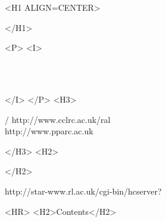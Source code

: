 \begin{htmlonly}
   \xlabel{}
   \begin{rawhtml} <H1 ALIGN=CENTER> \end{rawhtml}
      \stardoctitle
   \begin{rawhtml} </H1> \end{rawhtml}

   \begin{center}
   \end{center}

   \begin{rawhtml} <P> <I> \end{rawhtml}
   \stardoccategory\ \stardocnumber \\
   \stardocauthors \\
   \stardocdate
   \begin{rawhtml} </I> </P> <H3> \end{rawhtml}
       /
                        {http://www.cclrc.ac.uk/ral} \\
                        {http://www.pparc.ac.uk} \\
   \begin{rawhtml} </H3> <H2> \end{rawhtml}
   \begin{rawhtml} </H2> \end{rawhtml}
      {http://star-www.rl.ac.uk/cgi-bin/hcserver?\stardocsource}\\

  \label{stardoccontents}
  \begin{rawhtml}
    <HR>
    <H2>Contents</H2>
  \end{rawhtml}
  \newcommand{\latexonlytoc}[0]{}

\end{htmlonly}

